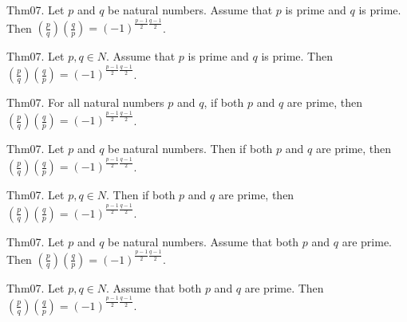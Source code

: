 \documentclass{article}
\begin{document}
Thm07. Let $p$ and $q$ be natural numbers. Assume that $p$ is prime and $q$ is prime. Then $\left(\frac{ p }{ q }\right) \left(\frac{ q }{ p }\right) = {(- 1)}^{ \frac{ p - 1 }{ 2}\frac{ q - 1 }{ 2}}$.

Thm07. Let $p , q \in N$. Assume that $p$ is prime and $q$ is prime. Then $\left(\frac{ p }{ q }\right) \left(\frac{ q }{ p }\right) = {(- 1)}^{ \frac{ p - 1 }{ 2}\frac{ q - 1 }{ 2}}$.

Thm07. For all natural numbers $p$ and $q$, if both $p$ and $q$ are prime, then $\left(\frac{ p }{ q }\right) \left(\frac{ q }{ p }\right) = {(- 1)}^{ \frac{ p - 1 }{ 2}\frac{ q - 1 }{ 2}}$.

Thm07. Let $p$ and $q$ be natural numbers. Then if both $p$ and $q$ are prime, then $\left(\frac{ p }{ q }\right) \left(\frac{ q }{ p }\right) = {(- 1)}^{ \frac{ p - 1 }{ 2}\frac{ q - 1 }{ 2}}$.

Thm07. Let $p , q \in N$. Then if both $p$ and $q$ are prime, then $\left(\frac{ p }{ q }\right) \left(\frac{ q }{ p }\right) = {(- 1)}^{ \frac{ p - 1 }{ 2}\frac{ q - 1 }{ 2}}$.

Thm07. Let $p$ and $q$ be natural numbers. Assume that both $p$ and $q$ are prime. Then $\left(\frac{ p }{ q }\right) \left(\frac{ q }{ p }\right) = {(- 1)}^{ \frac{ p - 1 }{ 2}\frac{ q - 1 }{ 2}}$.

Thm07. Let $p , q \in N$. Assume that both $p$ and $q$ are prime. Then $\left(\frac{ p }{ q }\right) \left(\frac{ q }{ p }\right) = {(- 1)}^{ \frac{ p - 1 }{ 2}\frac{ q - 1 }{ 2}}$.
\end{document}

